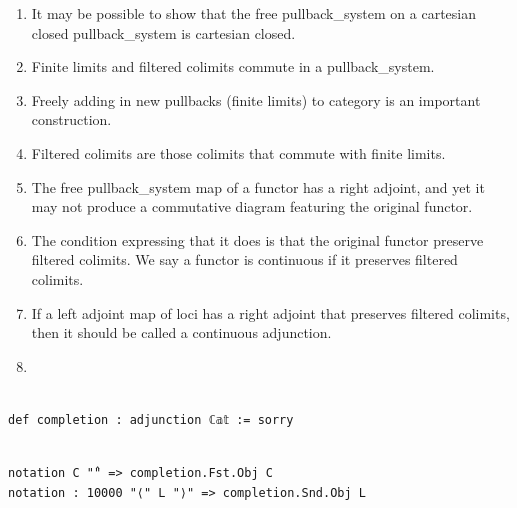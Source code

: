\documentclass{book}
\theoremstyle{definition}
\newcounter{lcounter}
\begin{document}
{{\begin{enumerate}
\item It may be possible to show that the free pullback_system on a cartesian closed pullback_system is cartesian closed.
\item Finite limits and filtered colimits commute in a pullback\_system.
\item Freely adding in new pullbacks (finite limits) to category is an important construction.
\item Filtered colimits are those colimits that commute with finite limits.
\item The free pullback_system map of a functor has a right adjoint, and yet it may not produce a commutative diagram featuring the original functor. 
\item The condition expressing that it does is that the original functor preserve filtered colimits. We say a functor is continuous if it preserves filtered colimits.
\item If a left adjoint map of loci has a right adjoint that preserves filtered colimits, then it should be called a continuous adjunction.
\item 
\end{enumerate}

\begin{center}
\begin{tcolorbox}[width=5in,colback={white},title={\begin{center}\texttt{Lean \thelcounter} \addtocounter{lcounter}{1}  \end{center}},colbacktitle=Blue,coltitle=black]
\begin{verbatim}

def completion : adjunction ℂ𝕒𝕥 := sorry

\end{verbatim}
\end{tcolorbox}
\end{center}

\begin{center}
\begin{tcolorbox}[width=5in,colback={white},title={\begin{center}\texttt{Lean \thelcounter} \addtocounter{lcounter}{1}  \end{center}},colbacktitle=Blue,coltitle=black]
\begin{verbatim}

notation C "̂" => completion.Fst.Obj C
notation : 10000 "⟨" L "⟩" => completion.Snd.Obj L


\end{verbatim}
\end{tcolorbox}
\end{center}}}
\end{document}
